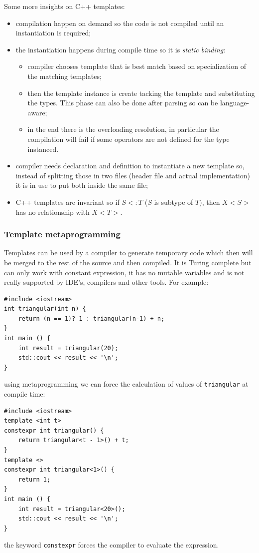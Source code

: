 Some more insights on C++ templates:
\begin{itemize}
    \item compilation happen on demand so the code is not compiled until an instantiation is required;
    \item the instantiation happens during compile time so it is \emph{static binding}:
    \begin{itemize}
        \item compiler chooses template that is best match based on specialization of the matching templates;
        \item then the template instance is create tacking the template and substituting the types.
        This phase can also be done after parsing so can be language-aware;
        \item in the end there is the overloading resolution, in particular the compilation will fail if some operators are not defined for the type instanced.
    \end{itemize}
    \item compiler needs declaration and definition to instantiate a new template so, instead of splitting those in two files (header file and actual implementation) it is in use to put both inside the same file;
    \item C++ templates are invariant so if $S <: T$ ($S$ is subtype of $T$), then $X<S>$ has no relationship with $X<T>$.
\end{itemize}

\subsubsection{Template metaprogramming}
Templates can be used by a compiler to generate temporary code which then will be merged to the rest of the source and then compiled.
It is Turing complete but can only work with constant expression, it has no mutable variables and is not really supported by IDE's, compilers and other tools.
For example:
\begin{verbatim}
#include <iostream>
int triangular(int n) {
    return (n == 1)? 1 : triangular(n-1) + n;
}
int main () {
    int result = triangular(20);
    std::cout << result << '\n';
}
\end{verbatim}
using metaprogramming we can force the calculation of values of \verb|triangular| at compile time:
\begin{verbatim}
#include <iostream>
template <int t>
constexpr int triangular() {
    return triangular<t - 1>() + t;
}
template <>
constexpr int triangular<1>() {
    return 1;
}
int main () {
    int result = triangular<20>();
    std::cout << result << '\n';
}
\end{verbatim}
the keyword \verb|constexpr| forces the compiler to evaluate the expression.


